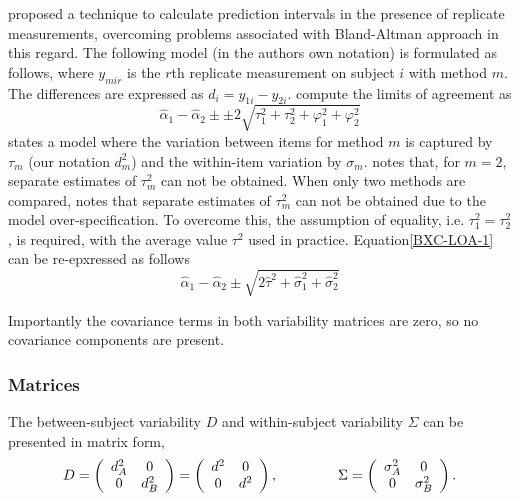 \documentclass[12pt, a4paper]{report}
\theoremstyle{plain}
\theoremstyle{definition}
\theoremstyle{remark}
\begin{document}
\citet{BXC2008} proposed a technique to calculate prediction intervals in the presence of replicate measurements, overcoming problems associated with Bland-Altman approach in this regard. The following model (in the authors own notation) is
formulated as follows, where $y_{mir}$ is the $r$th replicate
measurement on subject $i$ with method $m$. The differences are expressed as $d_{i} = y_{1i} - y_{2i}$. \citet{BXC2008} compute the limits of agreement as
\begin{equation}
\hat{\alpha}_1 - \hat{\alpha}_2 \pm \pm 2 \sqrt{ \tau^2_1 +  \tau^2_2 +  \varphi^2_1 +  \varphi^2_2 }
\label{BXC-LOA-1}
\end{equation}
\citet{BXC2008} states a model where the variation between items for method $m$ is captured by $\tau_m$ (our notation $d^2_m$) and the within-item variation by $\sigma_m$. \citet{BXC2008} notes that, for $m=2$, separate estimates of $\tau^2_m$ can not be obtained.  When only two methods are compared, \citet{BXC2008} notes that separate estimates of $\tau^2_m$ can not be obtained due to the model over-specification. To overcome this, the assumption of equality, i.e. $\tau^2_1 = \tau^2_2$, is required, with the average value $\tau^2$ used in practice. Equation\ref{BXC-LOA-1} can be re-epxressed as follows
\begin{equation}
\hat{\alpha}_1 - \hat{\alpha}_2 \pm \sqrt{2 \hat{\tau}^2 + \hat{\sigma}^2_1 + \hat{\sigma}^2_2}
\end{equation}

Importantly the covariance terms in both variability matrices are zero, so no covariance components are present.



\subsubsection*{Matrices}
The between-subject variability ${D}$ and within-subject variability ${\Sigma}$ can be presented in matrix form,\[
{D} = \left(%
\begin{array}{cc}
d^2_{A}& 0 \\
0 & d^2_{B} \\
\end{array}%
\right)=\left(%
\begin{array}{cc}
d^2& 0 \\
0 & d^2\\
\end{array}%
\right),
\hspace{1.5cm}
{\Sigma} = \left(%
\begin{array}{cc}
\sigma^2_{A}& 0 \\
0 & \sigma^2_{B} \\
\end{array}%
\right).
\]
\end{document}
